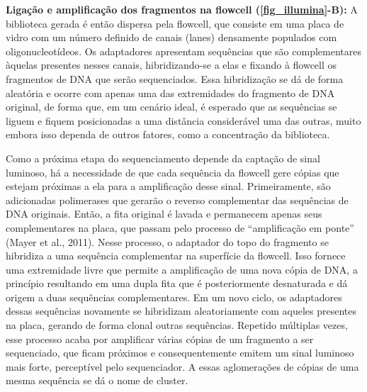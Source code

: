 \documentclass[../DISSERTACAO_MAIN.tex]{subfiles}
\begin{document}
\textbf{Ligação e amplificação dos fragmentos na flowcell (\autoref{fig_illumina}-B):}  A biblioteca gerada é então dispersa pela flowcell, que consiste em uma placa de vidro com um número definido de canais (lanes) densamente populados com oligonucleotídeos. Os adaptadores apresentam sequências que são complementares àquelas presentes nesses canais, hibridizando-se a elas e fixando à flowcell  os fragmentos de DNA que serão sequenciados. Essa hibridização se dá de forma aleatória e ocorre com apenas uma das extremidades do fragmento de DNA original, de forma que, em um cenário ideal, é esperado que as sequências se liguem e fiquem posicionadas a uma distância considerável uma das outras, muito embora isso dependa de outros fatores, como a concentração da biblioteca. 

Como a próxima etapa do sequenciamento depende da captação de sinal luminoso, há a necessidade de que cada sequência da flowcell gere cópias que estejam próximas a ela para a amplificação desse sinal. Primeiramente, são adicionadas polimerases que gerarão o reverso complementar das sequências de DNA originais. Então, a fita original é lavada e permanecem apenas seus complementares na placa, que passam pelo processo de “amplificação em ponte” (Mayer et al., 2011). Nesse processo, o adaptador do topo do fragmento se hibridiza a uma sequência complementar na superfície da flowcell. Isso fornece uma extremidade livre que permite a amplificação de uma nova cópia de DNA, a princípio resultando em uma dupla fita que é posteriormente desnaturada e dá origem a duas sequências complementares. Em um novo ciclo, os adaptadores dessas sequências novamente se hibridizam aleatoriamente com aqueles presentes na placa, gerando de forma clonal outras sequências.  Repetido múltiplas vezes, esse processo acaba por amplificar várias cópias de um fragmento a ser sequenciado, que ficam próximos e consequentemente emitem um sinal luminoso mais forte, perceptível pelo sequenciador. A essas aglomerações de cópias de uma mesma sequência se dá o nome de cluster. 
\end{document}
